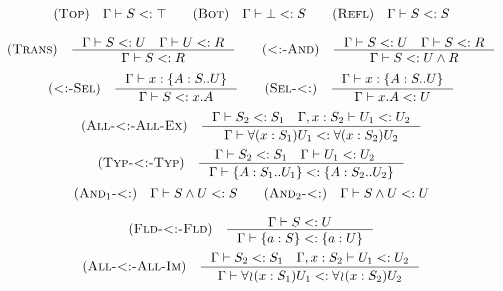 \[\begin{array}{c}
    \RULE{Top} \quad \SJT{\Gamma}{S}{\top} \qquad

    \RULE{Bot} \quad \SJT{\Gamma}{\bot}{S} \qquad

    \RULE{Refl} \quad \SJT{\Gamma}{S}{S} \\[4mm]

    \RULE{Trans} \quad \inference{
        \SJT{\Gamma}{S}{U} \quad
        \SJT{\Gamma}{U}{R}
    }{
        \SJT{\Gamma}{S}{R}
    } \qquad

    \RULE{<:-And} \quad \inference{
        \SJT{\Gamma}{S}{U} \quad
        \SJT{\Gamma}{S}{R}
    }{
        \SJT{\Gamma}{S}{\AGG{U}{R}}
    } \\[4mm]

    \RULE{<:-Sel} \quad \inference{
        \TJT{\Gamma}{x}{\TDEC{A}{S}{U}}
    }{
        \SJT{\Gamma}{S}{x.A}
    } \qquad

    \RULE{Sel-<:} \quad \inference{
        \TJT{\Gamma}{x}{\TDEC{A}{S}{U}}
    }{
        \SJT{\Gamma}{x.A}{U}
    } \\[4mm]

    \RULE{All-<:-All-Ex} \quad \inference{
        \SJT{\Gamma}{S_2}{S_1} \quad
        \SJT{\Gamma, x: S_2}{U_1}{U_2}
    }{
        \SJT{\Gamma}{\DFUN{x}{S_1}{U_1}}{\DFUN{x}{S_2}{U_2}}
    } \\[4mm]

    \RULE{Typ-<:-Typ} \quad \inference{
        \SJT{\Gamma}{S_2}{S_1} \quad
        \SJT{\Gamma}{U_1}{U_2} \quad
    }{
        \SJT{\Gamma}{\TDEC{A}{S_1}{U_1}}{\TDEC{A}{S_2}{U_2}}
    } \\[4mm]

    \RULE{And$_1$-<:} \quad \SJT{\Gamma}{\AGG{S}{U}}{S} \qquad

    \RULE{And$_2$-<:} \quad \SJT{\Gamma}{\AGG{S}{U}}{U} \\[4mm]

    \RULE{Fld-<:-Fld} \quad \inference{
        \SJT{\Gamma}{S}{U}
    }{
        \SJT{\Gamma}{\FDEC{a}{S}}{\FDEC{a}{U}}
    } \\[4mm]

    \RULE{All-<:-All-Im} \quad \inference{
        \SJT{\Gamma}{S_2}{S_1} \quad
        \SJT{\Gamma, x: S_2}{U_1}{U_2}
    }{
        \SJT{\Gamma}{\IFUN{x}{S_1}{U_1}}{\IFUN{x}{S_2}{U_2}}
    }
\end{array}\]
